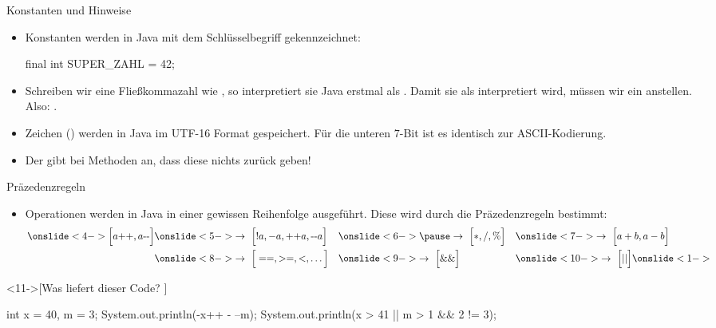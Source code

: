 \begin{frame}[fragile]{Konstanten und Hinweise}
    \begin{itemize}[<+(1)->]
        \widei
        \item Konstanten werden in Java mit dem Schlüsselbegriff  gekennzeichnet: \begin{plainjava}
final int SUPER_ZAHL = 42;
        \end{plainjava}
        \item Schreiben wir eine Fließkommazahl wie , so interpretiert sie Java erstmal als .\pause{} Damit sie als  interpretiert wird, müssen wir ein  anstellen.\pause{} Also: .
        \item Zeichen () werden in Java im UTF-16 Format gespeichert.\pause{} Für die unteren \(7\)-Bit ist es identisch zur ASCII-Kodierung.
        \item Der   gibt bei Methoden an,\pause{} dass diese nichts zurück geben!
    \end{itemize}
\end{frame}

\begin{frame}[fragile]{Präzedenzregeln}
    \begin{itemize}[<+(1)->]
        \widei
        \item Operationen werden in Java in einer gewissen Reihenfolge ausgeführt.\pause{} Diese wird durch die Präzedenzregeln bestimmt:
        \begin{alignat*}{3}
            \onslide<4->{\Big[a\text{++},a\text{-\!\! -}\Big]}&\onslide<5->{\to~\Big[!a, -a, \text{++}a,\text{-\!\! -}a\Big]}&&\onslide<6->{\pause\to~\Big[*,/,\%\Big]} &&\onslide<7->{\to~\Big[a+b,a-b\Big]}\\
            &\onslide<8->{\to~\Big[==,>=,<,\ldots\Big]} &&\onslide<9->{\to~\Big[\&\&\Big]}&&\onslide<10->{\to~\Big[||\Big]}\onslide<1->
        \end{alignat*}
        \vspace*{-0.5cm}
    \end{itemize}
\ifull
    \begin{exercise}<11->[Was liefert dieser Code? ]
        \begin{plainjava}[columns={[c]fullflexible}]
int x = 40, m = 3;
System.out.println(-x++ - --m);
System.out.println(x > 41 || m > 1 && 2 != 3);
        \end{plainjava}
    \end{exercise}
    \fi{}
\end{frame}

